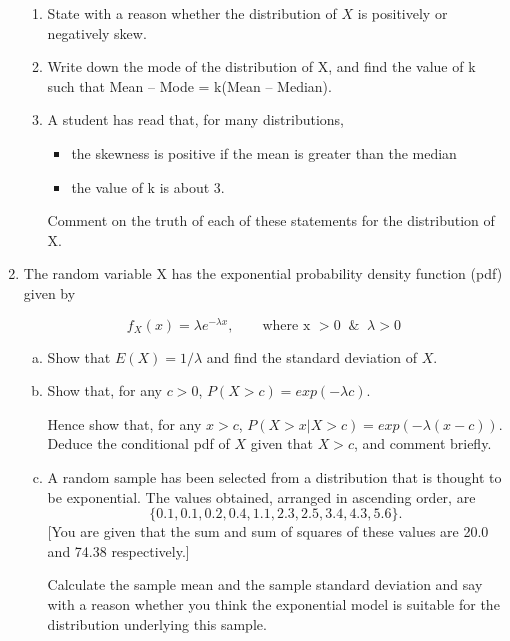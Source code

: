 \documentclass[a4paper,12pt]{article}
\begin{document}
\begin{enumerate}
\begin{enumerate}
\item State with a reason whether the distribution of $X$ is positively or negatively skew.

\item Write down the mode of the distribution of X, and find the value of k such that Mean – Mode = k(Mean – Median).

\item A student has read that, for many distributions,
\begin{itemize}
\item the skewness is positive if the mean is greater than the median
\item the value of k is about 3.
\end{itemize}

Comment on the truth of each of these statements for the distribution of X.
\end{enumerate}




\item The random variable X has the exponential probability density function (pdf) given by



$$ f_{X}(x) = \lambda e^{-\lambda x}, \qquad \mbox{where x } >0 \;\; \& \;\; \lambda >0 $$



\begin{enumerate}[(a)]

\item  Show that $ E(X) = 1/\lambda$ and find the standard deviation of $X$.

\item  Show that, for any $c > 0$, $P(X > c) = exp(−\lambda c)$.

Hence show that, for any $x > c$, $P(X > x | X > c) = exp(−\lambda(x−c))$. Deduce the conditional pdf of $X$ given that $X > c$, and comment briefly.

\item A random sample has been selected from a distribution that is thought to be exponential. The values obtained, arranged in ascending order, are $$\{0.1, 0.1, 0.2, 0.4, 1.1, 2.3, 2.5, 3.4, 4.3, 5.6\}.$$ [You are given that the sum and sum of squares of these values are 20.0 and 74.38 respectively.] 

Calculate the sample mean and the sample standard deviation and say with a reason whether you think the exponential model is suitable for the distribution underlying this sample.


\end{enumerate}
\end{enumerate}
\end{document}
